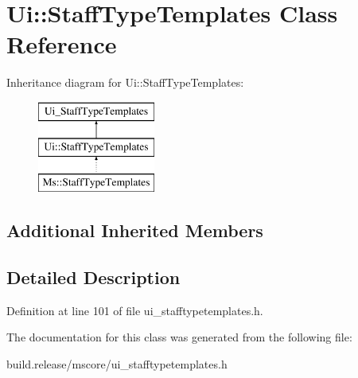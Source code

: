 \hypertarget{class_ui_1_1_staff_type_templates}{}\section{Ui\+:\+:Staff\+Type\+Templates Class Reference}
\label{class_ui_1_1_staff_type_templates}
Inheritance diagram for Ui\+:\+:Staff\+Type\+Templates\+:\begin{figure}[H]
\begin{center}
\leavevmode
\includegraphics[height=3.000000cm]{class_ui_1_1_staff_type_templates}
\end{center}
\end{figure}
\subsection*{Additional Inherited Members}


\subsection{Detailed Description}


Definition at line 101 of file ui\+\_\+stafftypetemplates.\+h.



The documentation for this class was generated from the following file\+:\begin{DoxyCompactItemize}
\item 
build.\+release/mscore/ui\+\_\+stafftypetemplates.\+h\end{DoxyCompactItemize}
